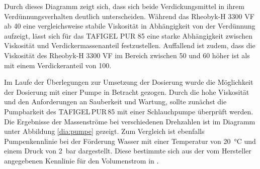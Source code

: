 \FloatBarrier 
Durch dieses Diagramm zeigt sich, dass sich beide Verdickungsmittel in ihrem Verdünnungsverhalten deutlich unterscheiden. Während das Rheobyk-H 3300 VF ab \SI{40}{\mpercent} eine vergleichsweise stabile Viskosität in Abhängigkeit von der Verdünnung aufzeigt, lässt sich für das TAFIGEL PUR 85 eine starke Abhängigkeit zwischen Viskosität und Verdickermassenanteil festzustellen. Auffallend ist zudem, dass die Viskosität des Rheobyk-H 3300 VF im Bereich zwischen 50 und \SI{60}{\mpercent} höher ist als mit einem Verdickeranteil von \SI{100}{\mpercent}.\linebreak
%
%
%


Im Laufe der Überlegungen zur Umsetzung der Dosierung wurde die Möglichkeit der Dosierung mit einer Pumpe in Betracht gezogen. Durch die hohe Viskosität und den Anforderungen an Sauberkeit und Wartung, sollte zunächst die Pumpbarkeit des TAFIGEL\,PUR\,85 mit einer Schlauchpumpe überprüft werden. Die Ergebnisse der Massenströme bei verschiedenen Drehzahlen ist im Diagramm unter Abbildung \ref{dia:pumpe} gezeigt. Zum Vergleich ist ebenfalls Pumpenkennlinie bei der Förderung Wasser mit einer Temperatur von \SI{20}{\celsius} und einem Druck von \SI{2}{\bar} dargestellt. Diese bestimmte sich aus der vom Hersteller angegebenen Kennlinie für den Volumenstrom in \cite{PonndorfGeratetechnikGmbH.2020}.

